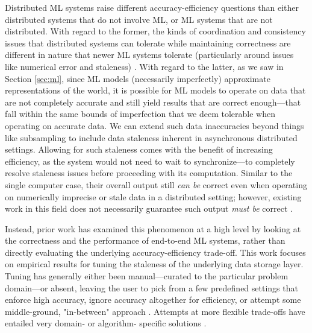 \documentclass[sigplan,screen]{acmart}
\begin{document}
Distributed ML systems raise different accuracy-efficiency questions than either distributed systems that do not involve ML, or ML systems that are not distributed. With regard to the former, the kinds of coordination and consistency issues that distributed systems can tolerate while maintaining correctness are different in nature that newer ML systems tolerate (particularly around issues like numerical error and staleness) \cite{bailis2012pbs, DeCandia2007dynamo,Yu2000numerical}. With regard to the latter, as we saw in Section \ref{sec:ml}, since ML models (necessarily imperfectly) approximate representations of the world, it is possible for ML models to operate on data that are not completely accurate and still yield results that are correct enough---that fall within the same bounds of imperfection that we deem tolerable when operating on accurate data. We can extend such data inaccuracies beyond things like subsampling to include data staleness inherent in asynchronous distributed settings. Allowing for such staleness comes with the benefit of increasing efficiency, as the system would not need to wait to synchronize---to completely resolve staleness issues before proceeding with its computation. Similar to the single computer case, their overall output still \emph{can be} correct even when operating on numerically imprecise or stale data in a distributed setting; however, existing work in this field does not necessarily guarantee such output \emph{must be} correct \cite{alistarh2018convergence,dutta2018slow, gong2014quantize, lian2017asynchronous, Niu2011hogwild, desa2015taming, zhang2015sgdstaleness}.

Instead, prior work has examined this phenomenon at a high level by looking at the correctness and the performance of end-to-end ML systems, rather than directly evaluating the underlying accuracy-efficiency trade-off. This work focuses on empirical results for tuning the staleness of the underlying data storage layer. Tuning has generally either been manual---curated to the particular problem domain---or absent, leaving the user to pick from a few predefined settings that enforce high accuracy, ignore accuracy altogether for efficiency, or attempt some middle-ground, "in-between" approach \cite{Abadi2016tf, ho2013SSPParameterServer, Li2014parameterserver, kosaian2019paritymodels, pan2016cyclades}. Attempts at more flexible trade-offs have entailed very domain- or algorithm- specific solutions \cite{Lloyd2011COP, pan2013occ, Wei2015managed}.
\end{document}
